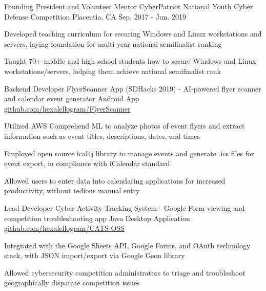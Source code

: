 \begin{cventries}
  \cventry
    {Founding President and Volunteer Mentor} %
    {CyberPatriot National Youth Cyber Defense Competition} %
    {Placentia, CA} %
    {Sep. 2017 - Jun. 2019} %
    {
      \begin{cvitems} %
        \item {Developed teaching curriculum for securing Windows and Linux workstations and servers, laying foundation for multi-year national semifinalist ranking}
        \item {Taught 70+ middle and high school students how to secure Windows and Linux workstations/servers, helping them achieve national semifinalist rank}
      \end{cvitems}
    }

\cventry
{Backend Developer} %
{FlyerScanner App (SDHacks 2019) - AI-powered flyer scanner and calendar event generator} %
{Android App} %
{\href{https://github.com/hexalellogram/FlyerScanner}{github.com/hexalellogram/FlyerScanner}} %
{
  \begin{cvitems} %
    \item {Utilized AWS Comprehend ML to analyze photos of event flyers and extract information such as event titles, descriptions, dates, and times}
    \item {Employed open source ical4j library to manage events and generate .ics files for event export, in compliance with iCalendar standard}
    \item {Allowed users to enter data into calendaring applications for increased productivity, without tedious manual entry}
  \end{cvitems}
}

\cventry
{Lead Developer} %
{Cyber Activity Tracking System - Google Form viewing and competition troubleshooting app} %
{Java Desktop Application} %
{\href{https://github.com/hexalellogram/CATS-OSS}{github.com/hexalellogram/CATS-OSS}} %
{
  \begin{cvitems} %
    \item {Integrated with the Google Sheets API, Google Forms, and OAuth technology stack, with JSON import/export via Google Gson library}
    \item {Allowed cybersecurity competition administrators to triage and troubleshoot geographically disparate competition issues}
  \end{cvitems}
}

\end{cventries}
